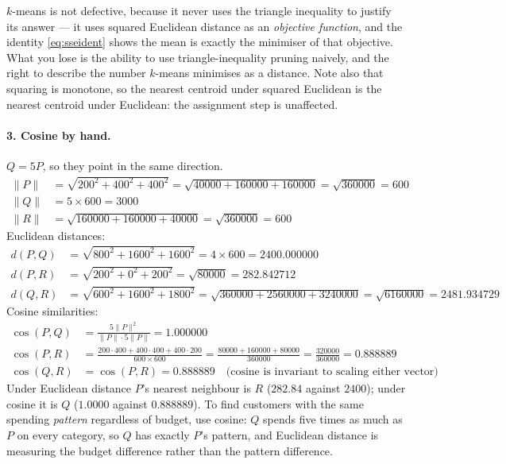 \documentclass[11pt]{article}
\begin{document}
$k$-means is not defective, because it never uses the triangle inequality to
justify its answer --- it uses squared Euclidean distance as an
\emph{objective function}, and the identity \eqref{eq:sseident} shows the
mean is exactly the minimiser of that objective. What you lose is the ability
to use triangle-inequality pruning naively, and the right to describe the
number $k$-means minimises as a distance. Note also that squaring is monotone,
so the nearest centroid under squared Euclidean is the nearest centroid under
Euclidean: the assignment step is unaffected.

\paragraph{3. Cosine by hand.}
$Q = 5P$, so they point in the same direction.
\begin{align*}
  \|P\| &= \sqrt{200^2 + 400^2 + 400^2} = \sqrt{40000 + 160000 + 160000}
    = \sqrt{360000} = 600 \\
  \|Q\| &= 5 \times 600 = 3000 \\
  \|R\| &= \sqrt{160000 + 160000 + 40000} = \sqrt{360000} = 600
\end{align*}
Euclidean distances:
\begin{align*}
  d(P,Q) &= \sqrt{800^2 + 1600^2 + 1600^2} = 4 \times 600 = 2400.000000 \\
  d(P,R) &= \sqrt{200^2 + 0^2 + 200^2} = \sqrt{80000} = 282.842712 \\
  d(Q,R) &= \sqrt{600^2 + 1600^2 + 1800^2} = \sqrt{360000+2560000+3240000}
    = \sqrt{6160000} = 2481.934729
\end{align*}
Cosine similarities:
\begin{align*}
  \cos(P,Q) &= \frac{5\|P\|^2}{\|P\| \cdot 5\|P\|} = 1.000000 \\
  \cos(P,R) &= \frac{200{\cdot}400 + 400{\cdot}400 + 400{\cdot}200}
    {600 \times 600} = \frac{80000+160000+80000}{360000}
    = \frac{320000}{360000} = 0.888889 \\
  \cos(Q,R) &= \cos(P,R) = 0.888889 \quad
    \text{(cosine is invariant to scaling either vector)}
\end{align*}
Under Euclidean distance $P$'s nearest neighbour is $R$ ($282.84$ against
$2400$); under cosine it is $Q$ ($1.0000$ against $0.888889$). To find
customers with the same spending \emph{pattern} regardless of budget, use
cosine: $Q$ spends five times as much as $P$ on every category, so $Q$ has
exactly $P$'s pattern, and Euclidean distance is measuring the budget
difference rather than the pattern difference.
\end{document}
